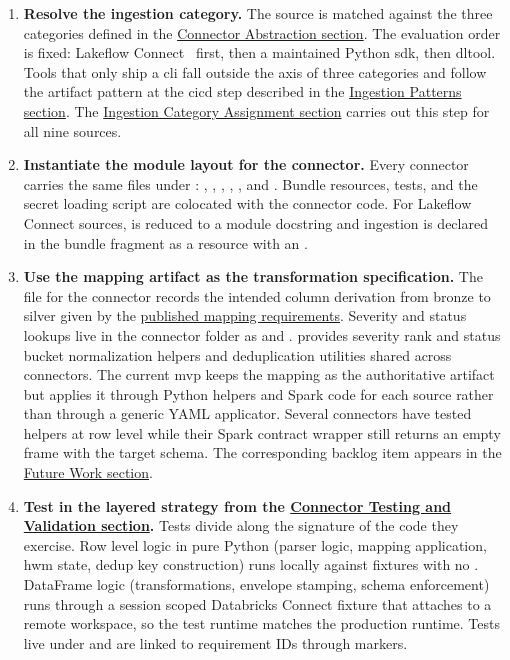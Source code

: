 \begin{enumerate}
    \item \textbf{Resolve the ingestion category.} The source is matched against the three categories defined in the \hyperref[sec:connector-abstraction]{Connector Abstraction section}. The evaluation order is fixed: Lakeflow Connect~\parencite{DatabricksLakeflowConnect2025} first, then a maintained Python \gls{sdk}, then \gls{dltool}. Tools that only ship a \gls{cli} fall outside the axis of three categories and follow the artifact pattern at the \gls{cicd} step described in the \hyperref[sec:ingestion-patterns]{Ingestion Patterns section}. The \hyperref[sec:ingestion-category-assignment]{Ingestion Category Assignment section} carries out this step for all nine sources.
    \item \textbf{Instantiate the module layout for the connector.} Every connector carries the same files under : , , , , , and . Bundle resources, tests, and the secret loading script are colocated with the connector code. For Lakeflow Connect sources,  is reduced to a module docstring and ingestion is declared in the bundle fragment as a  resource with an .
    \item \textbf{Use the mapping artifact as the transformation specification.} The  file for the connector records the intended column derivation from bronze to silver given by the \href{https://vkraus.github.io/appsec-mvp/platform/reference/canonical-mapping/}{published mapping requirements}. Severity and status lookups live in the connector folder as  and .  provides severity rank and status bucket normalization helpers and deduplication utilities shared across connectors. The current \gls{mvp} keeps the mapping as the authoritative artifact but applies it through Python helpers and Spark code for each source rather than through a generic YAML applicator. Several connectors have tested helpers at row level while their Spark contract wrapper still returns an empty frame with the target schema. The corresponding backlog item appears in the \hyperref[sec:future-work]{Future Work section}.
    \item \textbf{Test in the layered strategy from the \hyperref[sec:connector-testing]{Connector Testing and Validation section}.} Tests divide along the signature of the code they exercise. Row level logic in pure Python (parser logic, mapping application, \gls{hwm} state, dedup key construction) runs locally against  fixtures with no . DataFrame logic (transformations, envelope stamping, schema enforcement) runs through a session scoped Databricks Connect fixture that attaches to a remote workspace, so the test runtime matches the production runtime. Tests live under  and are linked to requirement IDs through  markers.

\end{enumerate}

